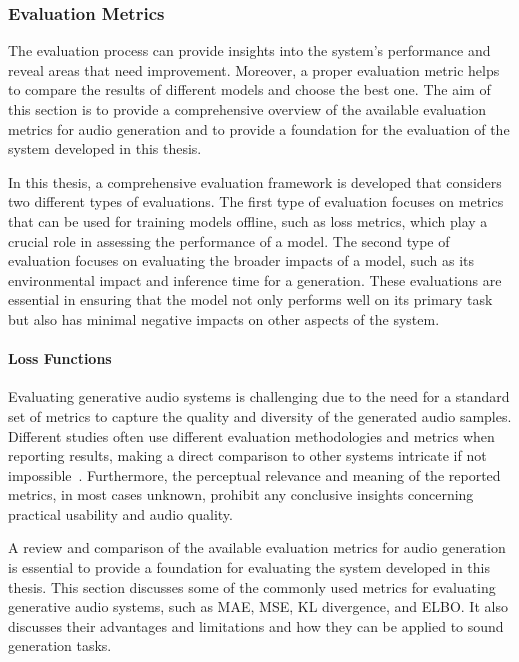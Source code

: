 \subsubsection{Evaluation Metrics} \label{sec:evaluation}

The evaluation process can provide insights into the system's performance and reveal areas that need improvement. Moreover, a proper evaluation metric helps to compare the results of different models and choose the best one. The aim of this section is to provide a comprehensive overview of the available evaluation metrics for audio generation and to provide a foundation for the evaluation of the system developed in this thesis.

In this thesis, a comprehensive evaluation framework is developed that considers two different types of evaluations. The first type of evaluation focuses on metrics that can be used for training models offline, such as loss metrics, which play a crucial role in assessing the performance of a model. The second type of evaluation focuses on evaluating the broader impacts of a model, such as its environmental impact and inference time for a generation. These evaluations are essential in ensuring that the model not only performs well on its primary task but also has minimal negative impacts on other aspects of the system.

\paragraph{Loss Functions} \label{sec:loss-functions}

Evaluating generative audio systems is challenging due to the need for a standard set of metrics to capture the quality and diversity of the generated audio samples. Different studies often use different evaluation methodologies and metrics when reporting results, making a direct comparison to other systems intricate if not impossible~\cite{vinay_evaluating_2022}. Furthermore, the perceptual relevance and meaning of the reported metrics, in most cases unknown, prohibit any conclusive insights concerning practical usability and audio quality.

A review and comparison of the available evaluation metrics for audio generation is essential to provide a foundation for evaluating the system developed in this thesis. This section discusses some of the commonly used metrics for evaluating generative audio systems, such as \ac{MAE}, \ac{MSE}, \ac{KL} divergence, and \ac{ELBO}. It also discusses their advantages and limitations and how they can be applied to sound generation tasks.

